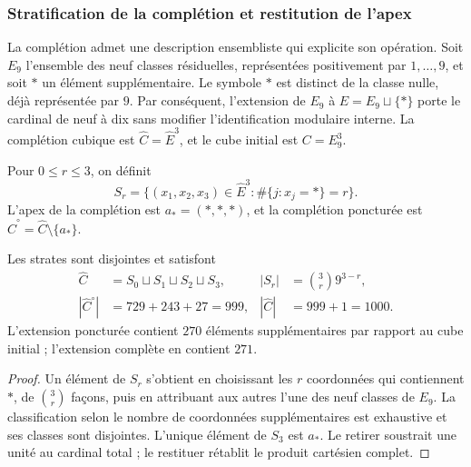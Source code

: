 \subsubsection{Stratification de la complétion et restitution de l'apex}
\label{sec:revision-emrh}

La complétion admet une description ensembliste qui explicite son
opération. Soit \(E_9\) l'ensemble des neuf classes résiduelles, représentées
positivement par \(1,\ldots,9\), et soit \(\ast\) un élément supplémentaire.
Le symbole \(\ast\) est distinct de la classe nulle, déjà représentée par \(9\).
Par conséquent, l'extension de \(E_9\) à
\(\widehat E=E_9\sqcup\{\ast\}\) porte le cardinal de neuf à dix
sans modifier l'identification modulaire interne. La complétion cubique est
\(\widehat C=\widehat E^3\), et le cube initial est \(C=E_9^3\).

\begin{definition}
Pour \(0\leq r\leq3\), on définit
\[
 S_r=\{(x_1,x_2,x_3)\in\widehat E^3:
             \#\{j:x_j=\ast\}=r\}.
\]
L'apex de la complétion est \(a_\ast=(\ast,\ast,\ast)\), et la
complétion poncturée est \(\widehat C^{\circ}=\widehat C\setminus\{a_\ast\}\).
\end{definition}

\begin{proposition}
Les strates sont disjointes et satisfont
\begin{align}
 \widehat C&=S_0\sqcup S_1\sqcup S_2\sqcup S_3,
 &|S_r|&=\binom3r9^{3-r},\label{eq:revision-estratos}\\
 |\widehat C^{\circ}|&=729+243+27=999,
 &|\widehat C|&=999+1=1000.\label{eq:revision-999}
\end{align}
L'extension poncturée contient \(270\) éléments supplémentaires par rapport au cube
initial ; l'extension complète en contient \(271\).
\end{proposition}
\begin{proof}
Un élément de \(S_r\) s'obtient en choisissant les \(r\) coordonnées qui
contiennent \(\ast\), de \(\binom3r\) façons, puis en attribuant aux autres
l'une des neuf classes de \(E_9\). La classification selon le nombre de
coordonnées supplémentaires est exhaustive et ses classes sont disjointes. L'unique
élément de \(S_3\) est \(a_\ast\). Le retirer soustrait une unité au cardinal
total ; le restituer rétablit le produit cartésien complet.
\end{proof}

